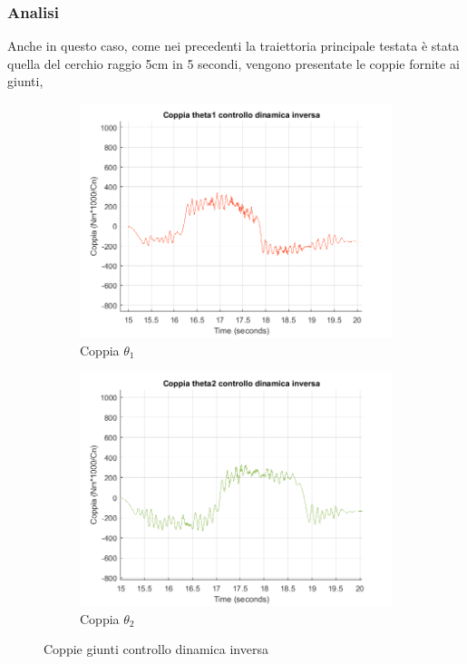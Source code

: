 \subsubsection*{Analisi}
Anche in questo caso, come nei precedenti la traiettoria principale testata è stata quella del cerchio raggio 5cm in 5 secondi, vengono presentate le coppie fornite ai giunti,
\begin{figure}
\begin{subfigure}{.53\textwidth}
  \includegraphics[width=.9\linewidth]{Immagini/Traiettorie/CoppiaT1ID}  
  \caption{Coppia $\theta_1$}
  \label{fig:sub-ikd1}
\end{subfigure}
\begin{subfigure}{.53\textwidth}
  \includegraphics[width=.9\linewidth]{Immagini/Traiettorie/CoppiaT2ID}  
  \caption{Coppia $\theta_2$}
  \label{fig:sub-ikd2}
\end{subfigure}
\caption{Coppie giunti controllo dinamica inversa}
\label{fig:CoppieID}
\end{figure}
